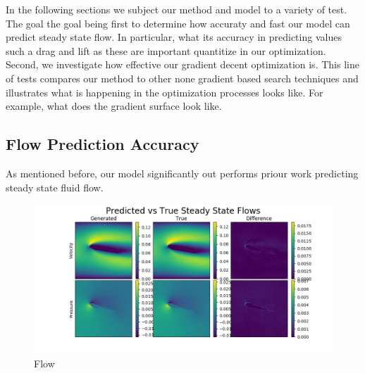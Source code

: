 \documentclass{article} %
\begin{document}
In the following sections we subject our method and model to a variety of test. The goal the goal being first to determine how accuraty and fast our model can predict steady state flow. In particular, what its accuracy in predicting values such a drag and lift as these are important quantitize in our optimization. Second, we investigate how effective our gradient decent optimization is. This line of tests compares our method to other none gradient based search techniques and illustrates what is happening in the optimization processes looks like. For example, what does the gradient surface look like.

\subsection{Flow Prediction Accuracy}

As mentioned before, our model significantly out performs priour work predicting steady state fluid flow. 

\begin{figure}[h]
\begin{center}
\includegraphics[scale=0.15]{../test/figs/generated_flow_difference.jpeg}
\end{center}
\caption{Flow}
\end{figure}
\end{document}
